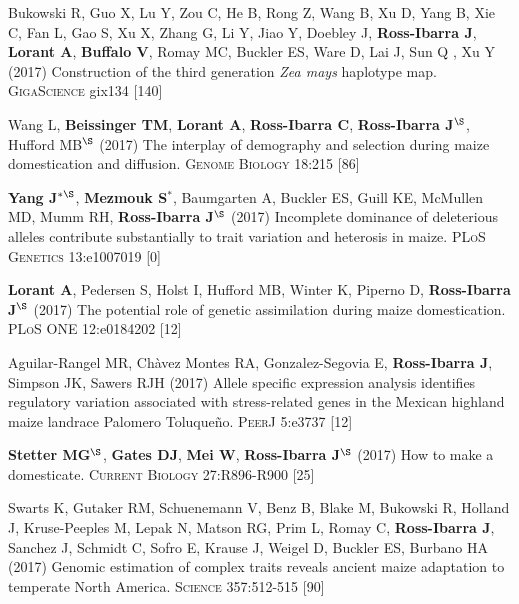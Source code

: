 \documentclass[letterpaper,10pt]{article}
\begin{document}
\begin{etaremune}
\item Bukowski R, Guo X, Lu Y, Zou C, He B, Rong Z, Wang B,  Xu D,  Yang B, Xie C,  Fan L, Gao S, Xu X, Zhang G, Li Y, Jiao Y, Doebley J, {\bf Ross-Ibarra J}, {\bf Lorant A}, {\bf Buffalo V}, Romay MC, Buckler ES, Ware D, Lai J, Sun Q , Xu Y (2017) Construction of the third generation \emph{Zea mays} haplotype map. \textsc{GigaScience} gix134
 [140]\\

\item Wang L, \textbf{Beissinger TM}, \textbf{Lorant A}, \textbf{Ross-Ibarra C}, \textbf{Ross-Ibarra J}$^\S$, Hufford MB$^\S$ (2017) The interplay of demography and selection during maize domestication and diffusion. \textsc{Genome Biology} 18:215
 [86]\\

\item {\bf Yang J}$^{*\S}$, {\bf Mezmouk S}$^*$, Baumgarten A, Buckler ES, Guill KE, McMullen MD, Mumm RH, {\bf Ross-Ibarra J}$^\S$ (2017) Incomplete dominance of deleterious alleles contribute substantially to trait variation and heterosis in maize. \textsc{PLoS Genetics} 13:e1007019
 [0]\\

\item \textbf{Lorant A}, Pedersen S, Holst I, Hufford MB, Winter K, Piperno D, \textbf{Ross-Ibarra J}$^\S$ (2017) The potential role of genetic assimilation during maize domestication. \textsc{PLoS ONE} 12:e0184202
 [12]\\

\item Aguilar-Rangel MR, Ch\`{a}vez Montes RA,  Gonzalez-Segovia E, \textbf{Ross-Ibarra J}, Simpson JK, Sawers RJH (2017) Allele specific expression analysis identifies regulatory variation associated with stress-related genes in the Mexican highland maize landrace Palomero Toluque\~{n}o. \textsc{PeerJ} 5:e3737
 [12]\\

\item   {\bf Stetter MG}$^\S$, {\bf Gates DJ}, {\bf Mei W}, {\bf Ross-Ibarra J}$^\S$ (2017) How to make a domesticate. \textsc{Current Biology} 27:R896-R900
 [25]\\

\item Swarts K, Gutaker RM,   Schuenemann V,  Benz B,  Blake M, Bukowski R, Holland J, Kruse-Peeples M, Lepak N, Matson RG, Prim L, Romay C, {\bf Ross-Ibarra J}, Sanchez J, Schmidt C,  Sofro E,  Krause J,  Weigel D,  Buckler ES,  Burbano HA (2017) Genomic estimation of complex traits reveals ancient maize adaptation to temperate North America. \textsc{Science} 357:512-515
 [90]\\


\end{etaremune}
\end{document}
